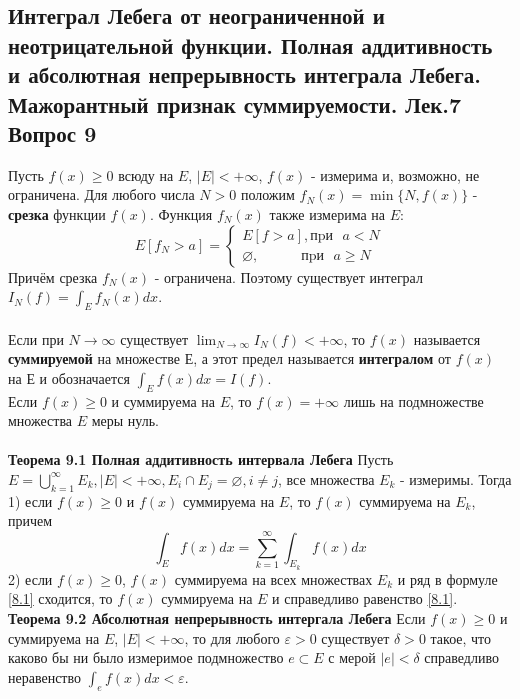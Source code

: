 \documentclass{article}
\begin{document}
\subsection{Интеграл Лебега от неограниченной и неотрицательной функции. Полная аддитивность и абсолютная непрерывность интеграла Лебега. Мажорантный признак суммируемости. Лек.7 \textbf{Вопрос 9}}
	Пусть $f(x)\geq 0$ всюду на $E$, $|E|<+\infty$, $f(x)$  - измерима и, возможно, не ограничена. Для любого числа $N>0$ положим $f_{N}(x)=\min \{N, f(x)\}$ - \textbf{срезка} функции $f(x)$. Функция $f_{N}(x)$ также измерима на $E$:
	\begin{equation}
	E\left[f_{N}>a\right]=\left\{\begin{array}{c}
	E[f>a], \text{пpи} \text{ } a<N \\
	\varnothing, \qquad \quad \text{пpи} \text{ } a \geq N
	\end{array}\right.
	\end{equation}
	Причём срезка $f_{N}(x)$ - ограничена. Поэтому существует интеграл $I_{N}(f)=\int_{E} f_{N}(x)dx$.\\
	\\
	Если при $N \rightarrow \infty$ существует $\lim _{N \rightarrow \infty} I_{N}(f)<+\infty$, то $f(x)$ называется \textbf{суммируемой} на множестве $Е$, а этот предел называется \textbf{интегралом} от $f(x)$ на $Е$ и обозначается $\int_{E} f(x) dx=I(f)$.\\
	Если $f(x)\ge 0$ и суммируема на $E$, то $f(x)=+\infty$ лишь на подмножестве множества $E$ меры нуль.\\
	\\
	\textbf{Теорема 9.1 Полная аддитивность интервала Лебега} Пусть $E=\bigcup_{k=1}^{\infty} {E}_{k}, |E|<+\infty, {E}_{i}\cap {E}_{j}=\varnothing, i\ne j$, все множества ${E}_{k}$ - измеримы. Тогда \\
	1) если $f(x)\ge 0$ и $f(x)$ суммируема на $E$, то $f(x)$ суммируема на ${E}_{k}$, причем
	\begin{equation}
	\label{8.1}
	\int_{E} f(x) d x=\sum_{k=1}^{\infty} \int_{E_{k}} f(x)dx
	\end{equation}
	2) если $f(x)\ge 0$, $f(x)$ суммируема на всех множествах ${E}_{k}$ и ряд в формуле \ref{8.1} сходится, то $f(x)$ суммируема на $E$ и справедливо равенство \ref{8.1}.\\
	
	\textbf{Теорема 9.2 Абсолютная непрерывность интергала Лебега}
	Если $f(x)\ge 0$ и суммируема на $E$, $|E|<+\infty$, то для любого $\varepsilon >0$ существует $\delta >0$ такое, что каково бы ни
	было измеримое подмножество $e\subset E$ с мерой $|e|<\delta$ справедливо неравенство $\int_{e} f(x)dx<\varepsilon$.\\
	
\end{document}
